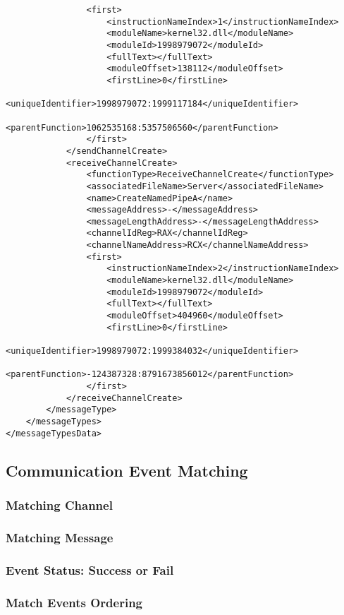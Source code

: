 \documentclass[paper=a4, fontsize=11pt]{scrartcl}
\numberwithin{equation}{section}		%
\numberwithin{figure}{section}			%
\numberwithin{table}{section}				%
\begin{document}
\begin{lstlisting}
                <first>
                    <instructionNameIndex>1</instructionNameIndex>
                    <moduleName>kernel32.dll</moduleName>
                    <moduleId>1998979072</moduleId>
                    <fullText></fullText>
                    <moduleOffset>138112</moduleOffset>
                    <firstLine>0</firstLine>
                    <uniqueIdentifier>1998979072:1999117184</uniqueIdentifier>
                    <parentFunction>1062535168:5357506560</parentFunction>
                </first>
            </sendChannelCreate>
            <receiveChannelCreate>
                <functionType>ReceiveChannelCreate</functionType>
                <associatedFileName>Server</associatedFileName>
                <name>CreateNamedPipeA</name>
                <messageAddress>-</messageAddress>
                <messageLengthAddress>-</messageLengthAddress>
                <channelIdReg>RAX</channelIdReg>
                <channelNameAddress>RCX</channelNameAddress>
                <first>
                    <instructionNameIndex>2</instructionNameIndex>
                    <moduleName>kernel32.dll</moduleName>
                    <moduleId>1998979072</moduleId>
                    <fullText></fullText>
                    <moduleOffset>404960</moduleOffset>
                    <firstLine>0</firstLine>
                    <uniqueIdentifier>1998979072:1999384032</uniqueIdentifier>
                    <parentFunction>-124387328:8791673856012</parentFunction>
                </first>
            </receiveChannelCreate>
        </messageType>
    </messageTypes>
</messageTypesData>
\end{lstlisting}



\subsection{Communication Event Matching}
\subsubsection{Matching Channel}
\subsubsection{Matching Message}
\subsubsection{Event Status: Success or Fail}
\subsubsection{Match Events Ordering}
\end{document}
